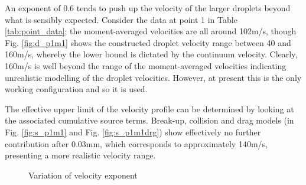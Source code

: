 \documentclass[a4paper,10pt]{article}
\begin{document}
An exponent of 0.6 tends to push up the velocity of the larger droplets beyond what is sensibly expected. Consider the data at point 1 in Table \ref{tab:point_data}; the moment-averaged velocities are all around 102m/s, though Fig. \ref{fig:d_p1m1} shows the constructed droplet velocity range between 40 and 160m/s, whereby the lower bound is dictated by the continuum velocity. Clearly, 160m/s is well beyond the range of the moment-averaged velocities indicating unrealistic modelling of the droplet velocities. However, at present this is the only working configuration and so it is used.

The effective upper limit of the velocity profile can be determined by looking at the associated cumulative source terms. Break-up, collision and drag models (in Fig. \ref{fig:s_p1m1} and Fig. \ref{fig:s_p1m1drg}) show effectively no further contribution after 0.03mm, which corresponds to approximately 140m/s, presenting a more realistic velocity range.

\begin{figure}[H]
\centering
{}
\caption{Variation of velocity exponent}
\label{fig:vel_exp_ch}
\end{figure}
\end{document}
